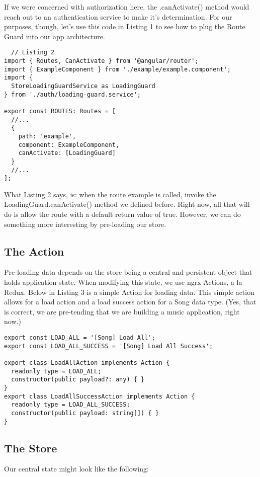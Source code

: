 If we were concerned with authorization here, the .canActivate() method would
reach out to an authentication service to make it's determination. For our
purposes, though, let's use this code in Listing 1 to see how to plug the Route
Guard into our app architecture.

\begin{lstlisting}
  // Listing 2
import { Routes, CanActivate } from '@angular/router';
import { ExampleComponent } from './example/example.component';
import {
  StoreLoadingGuardService as LoadingGuard
} from './auth/loading-guard.service';

export const ROUTES: Routes = [
  //...
  {
    path: 'example',
    component: ExampleComponent,
    canActivate: [LoadingGuard]
  }
  //...
];

\end{lstlisting}

What Listing 2 says, is: when the route example is called, invoke the
LoadingGuard.canActivate() method we defined before. Right now, all that will
do is allow the route with a default return value of true. However, we can do
something more interesting by pre-loading our store.

\subsection{ The Action }
Pre-loading data depends on the store being a central and persistent object that
holds application state. When modifying this state, we use ngrx Actions, a la
Redux.  Below in Listing 3 is a simple Action for loading data. This simple
action allows for a load action and a load success action for a Song data type.
(Yes, that is correct, we are pre-tending that we are building a music
application, right now.)

\begin{lstlisting}
export const LOAD_ALL = '[Song] Load All';
export const LOAD_ALL_SUCCESS = '[Song] Load All Success';

export class LoadAllAction implements Action {
  readonly type = LOAD_ALL;
  constructor(public payload?: any) { }
}
export class LoadAllSuccessAction implements Action {
  readonly type = LOAD_ALL_SUCCESS;
  constructor(public payload: string[]) { }
}
\end{lstlisting}

\subsection{The Store}
Our central state might look like the following:

